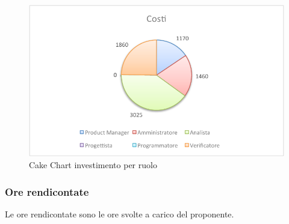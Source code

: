 				\begin{figure}[H]\centering
					\includegraphics[width=\textwidth]{PianoDiProgetto/Pics/ChartTotCostiInvest.pdf}
					\caption{Cake Chart investimento per ruolo}
				\end{figure}
		\subsubsection{Ore rendicontate}
			Le ore rendicontate sono le ore svolte a carico del proponente.
